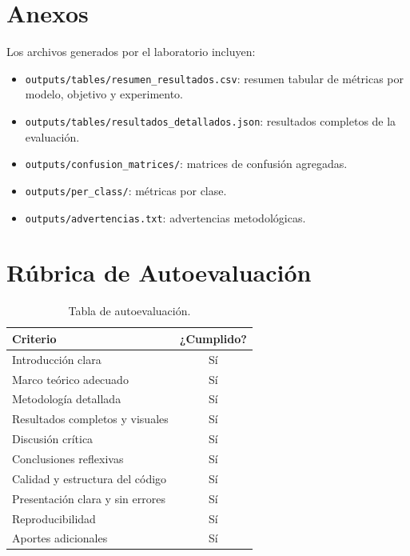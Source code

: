 \documentclass[conference]{IEEEtran}
\begin{document}
\appendices

\section{Anexos}
Los archivos generados por el laboratorio incluyen:

\begin{itemize}
  \item \texttt{outputs/tables/resumen\_resultados.csv}: resumen tabular de métricas por modelo, objetivo y experimento.
  \item \texttt{outputs/tables/resultados\_detallados.json}: resultados completos de la evaluación.
  \item \texttt{outputs/confusion\_matrices/}: matrices de confusión agregadas.
  \item \texttt{outputs/per\_class/}: métricas por clase.
  \item \texttt{outputs/advertencias.txt}: advertencias metodológicas.
\end{itemize}

\section{Rúbrica de Autoevaluación}

\begin{table}[!h]
\centering
\begin{tabular}{|l|c|}
\hline
\textbf{Criterio} & \textbf{¿Cumplido?} \\
\hline
Introducción clara & Sí \\
Marco teórico adecuado & Sí \\
Metodología detallada & Sí \\
Resultados completos y visuales & Sí \\
Discusión crítica & Sí \\
Conclusiones reflexivas & Sí \\
Calidad y estructura del código & Sí \\
Presentación clara y sin errores & Sí \\
Reproducibilidad & Sí \\
Aportes adicionales & Sí \\
\hline
\end{tabular}
\caption{Tabla de autoevaluación.}
\end{table}
\end{document}
